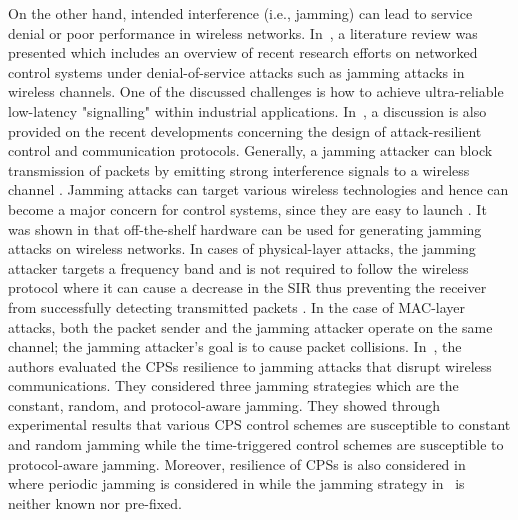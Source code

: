 On the other hand, intended interference (i.e., jamming) can lead to service denial or poor performance in wireless networks. In~\cite{8631535}, a literature review was presented which includes an overview of recent research efforts on networked control systems under denial-of-service attacks such as jamming attacks in wireless channels. One of the discussed challenges is how to achieve ultra-reliable low-latency "signalling" within industrial applications. In~\cite{Cetinkaya_2019}, a discussion is also provided on the recent developments concerning the design of attack-resilient control and communication protocols. Generally, a jamming attacker can block transmission of packets by emitting strong interference signals to a wireless channel \cite{1637931,5473884}. Jamming attacks can target various wireless technologies and hence can become a major concern for control systems, since they are easy to launch \cite{5473884}. It was shown in \cite{10.1007/978-3-319-07788-8_40} that off-the-shelf hardware can be used for generating jamming attacks on wireless networks. In cases of physical-layer attacks, the jamming attacker targets a frequency band and is not required to follow the wireless protocol where it can cause a decrease in the SIR thus preventing the receiver from successfully detecting transmitted packets \cite{10.1007/978-3-319-07788-8_40}. In the case of MAC-layer attacks, both the packet sender and the jamming attacker operate on the same channel; the jamming attacker’s goal is to cause packet collisions.
In~\cite{8726803}, the authors evaluated the CPSs resilience to jamming attacks that disrupt wireless communications. They considered three jamming strategies which are the constant, random, and protocol-aware jamming. They showed through experimental results that various CPS control schemes are susceptible to constant and random jamming while the time-triggered control schemes are susceptible to protocol-aware jamming. Moreover, resilience of CPSs is also considered in~\cite{6425868,DEPERSIS2014134,7402971,7575630} where periodic jamming is considered in \cite{6425868} while the jamming strategy in~\cite{DEPERSIS2014134,7402971,7575630} is neither known nor pre-fixed. 

